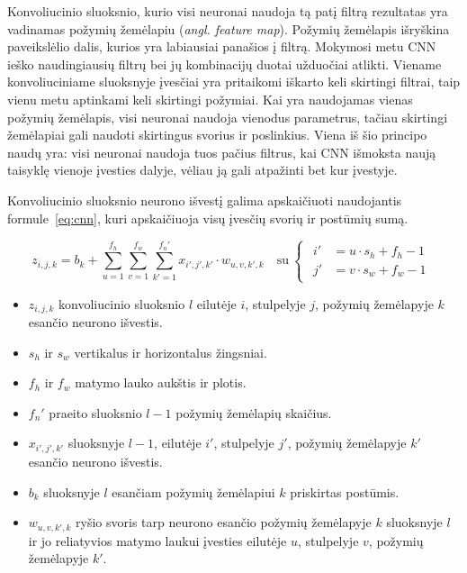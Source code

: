\documentclass{VUMIFPSbakalaurinis}
\begin{document}
{	Konvoliucinio sluoksnio, kurio visi neuronai naudoja tą patį filtrą rezultatas yra vadinamas požymių žemėlapiu (\textit{angl. feature map}). Požymių žemėlapis išryškina paveikslėlio dalis, kurios yra labiausiai panašios į filtrą. Mokymosi metu CNN ieško naudingiausių filtrų bei jų kombinacijų duotai užduočiai atlikti. Viename konvoliuciniame sluoksnyje įvesčiai yra pritaikomi iškarto keli skirtingi filtrai, taip vienu metu aptinkami keli skirtingi požymiai. Kai yra naudojamas vienas požymių žemėlapis, visi neuronai naudoja vienodus parametrus, tačiau skirtingi žemėlapiai gali naudoti skirtingus svorius ir poslinkius. Viena iš šio principo naudų yra: visi neuronai naudoja tuos pačius filtrus, kai CNN išmoksta naują taisyklę vienoje įvesties dalyje, vėliau ją gali atpažinti bet kur įvestyje. \par
	
	Konvoliucinio sluoksnio neurono išvestį galima apskaičiuoti naudojantis formule~\ref{eq:cnn}, kuri apskaičiuoja visų įvesčių svorių ir postūmių sumą.
	
	\begin{equation}\label{eq:cnn}
		z_{i, j, k} = b_k + \sum_{u=1}^{f_h} \sum_{v=1}^{f_w} \sum_{k'=1}^{f_n'} x_{i', j', k'} \cdot w_{u,v,k',k} 
		\quad \textrm{su} \
		\begin{cases}
			\begin{aligned}
				i' &= u \cdot s_h + f_h - 1 \\
				j' &= v \cdot s_w + f_w - 1 
			\end{aligned}
		\end{cases} 
	\end{equation}
	
	\begin{itemize}
		\item \(z_{i, j, k}\) konvoliucinio sluoksnio \(l\) eilutėje \(i\), stulpelyje \(j\), požymių žemėlapyje \(k\) esančio neurono išvestis.
		\item \(s_h\) ir \(s_w\) vertikalus ir horizontalus žingsniai.
		\item \(f_h\) ir \(f_w\) matymo lauko aukštis ir plotis.
		\item \(f_n'\) praeito sluoksnio \(l-1\) požymių žemėlapių skaičius.
		\item \(x_{i', j', k'}\) sluoksnyje \(l-1\), eilutėje \(i'\), stulpelyje \(j'\), požymių žemėlapyje \(k'\) esančio neurono išvestis.
		\item \(b_k\) sluoksnyje \(l\) esančiam požymių žemėlapiui \(k\) priskirtas postūmis.
		\item \(w_{u,v,k',k}\) ryšio svoris tarp neurono esančio požymių žemėlapyje \(k\) sluoksnyje \(l\) ir jo reliatyvios matymo laukui įvesties eilutėje \(u\), stulpelyje \(v\), požymių žemėlapyje \(k'\).
	\end{itemize}
}	
\end{document}
